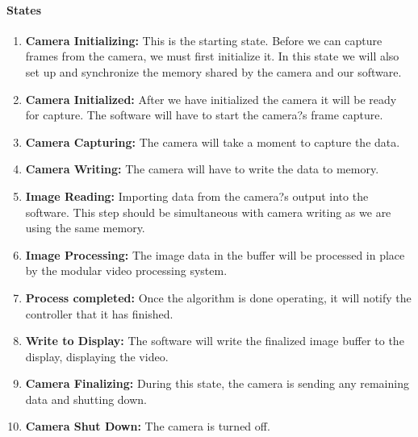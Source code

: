 	\paragraph{States}
	
	\begin{enumerate}[leftmargin=2cm,labelindent=2cm]
	\item \textbf{Camera Initializing:}
	This is the starting state. Before we can capture frames from the camera, we must first initialize it. In this state we will also set up and synchronize 	the memory shared by the camera and our software.

	\item \textbf{Camera Initialized:}
	After we have initialized the camera it will be ready for capture. The software will have to start the camera?s frame capture.

	\item \textbf{Camera Capturing:}
	The camera will take a moment to capture the data.

	\item \textbf{Camera Writing:} 
	The camera will have to write the data to memory. 

	\item \textbf{Image Reading:}
	Importing data from the camera?s output into the software. This step should be simultaneous with camera writing as we are using the same 		memory. 

	\item \textbf{Image Processing:} 
	The image data in the buffer will be processed in place by the modular video processing system.

	\item \textbf{Process completed:}
	Once the algorithm is done operating, it will notify the controller that it has finished.

	\item \textbf{Write to Display:}
	The software will write the finalized image buffer to the display, displaying the video.

	\item \textbf{Camera Finalizing:}
	During this state, the camera is sending any remaining data and shutting down.

	\item \textbf{Camera Shut Down:}
	The camera is turned off. \\
	\end{enumerate}
	
